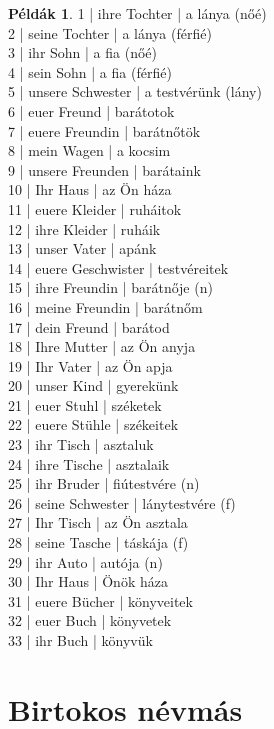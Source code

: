 \documentclass{article}
\theoremstyle{definition}
\newtheorem*{exmp}{Példák}
\begin{document}
\begin{exmp}
1 | ihre Tochter | a lánya (nőé)\\
2 | seine Tochter | a lánya (férfié)\\
3 | ihr Sohn | a fia (nőé)\\
4 | sein Sohn | a fia (férfié)\\
5 | unsere Schwester | a testvérünk (lány)\\
6 | euer Freund | barátotok\\
7 | euere Freundin | barátnőtök\\
8 | mein Wagen | a kocsim\\
9 | unsere Freunden | barátaink\\
10 | Ihr Haus | az Ön háza\\
11 | euere Kleider | ruháitok\\
12 | ihre Kleider | ruháik\\
13 | unser Vater | apánk\\
14 | euere Geschwister | testvéreitek\\
15 | ihre Freundin | barátnője (n)\\
16 | meine Freundin | barátnőm\\
17 | dein Freund | barátod\\
18 | Ihre Mutter | az Ön anyja\\
19 | Ihr Vater | az Ön apja\\
20 | unser Kind | gyerekünk\\
21 | euer Stuhl | széketek\\
22 | euere Stühle | székeitek\\
23 | ihr Tisch | asztaluk\\
24 | ihre Tische | asztalaik\\
25 | ihr Bruder | fiútestvére (n)\\
26 | seine Schwester | lánytestvére (f)\\
27 | Ihr Tisch | az Ön asztala\\
28 | seine Tasche | táskája (f)\\
29 | ihr Auto | autója (n)\\
30 | Ihr Haus | Önök háza\\
31 | euere Bücher | könyveitek\\
32 | euer Buch | könyvetek\\
33 | ihr Buch | könyvük\\
\end{exmp}

\section{Birtokos névmás}
\end{document}
